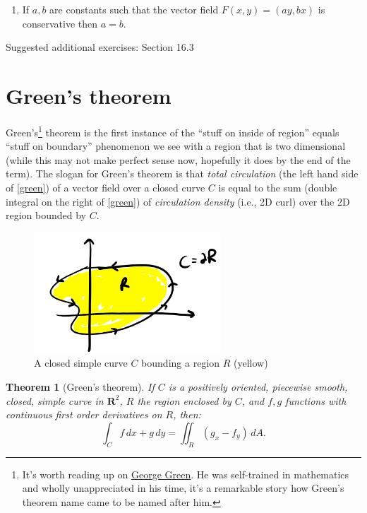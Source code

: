 \documentclass[12pt]{article}
\numberwithin{equation}{subsection}
\numberwithin{figure}{subsection}
\newtheorem{thm}[subsection]{Theorem}
\theoremstyle{note}
\begin{document}
{\begin{enumerate}[label=\arabic*.]
\begin{enumerate}
	\item If $a,b$ are constants such that the vector field $F(x,y)=(ay,bx)$ is conservative then $a=b$. 
\end{enumerate}

\end{enumerate}
Suggested additional exercises: Section 16.3 

\section{Green's theorem}

Green's\footnote{It's worth reading up on \href{https://en.wikipedia.org/wiki/George_Green_(mathematician)}{George Green}. He was self-trained in mathematics and wholly unappreciated in his time, it's a remarkable story how Green's theorem name came to be named after him.}  theorem is the first instance of the ``stuff on inside of region'' equals ``stuff on boundary'' phenomenon we see with a region that is two dimensional (while this may not make perfect sense now, hopefully it does by the end of the term). The slogan for Green's theorem is that \textit{total circulation} (the left hand side of \ref{green}) of a vector field over a closed curve $C$ is equal to the sum (double integral on the right of \ref{green}) of \textit{circulation density} (i.e., 2D curl) over the 2D region bounded by $C$. 
\begin{figure}[h!]
\centering
\includegraphics[width=70mm]{Images/greens-region}
\caption{A closed simple curve $C$ bounding a region $R$ (yellow)}
\label{fig-greens-curve}
\end{figure}
\begin{thm}[Green's theorem]\label{thm-green}If $C$ is a positively oriented, piecewise smooth, closed, simple curve in $\mathbf{R}^2$, $R$ the region enclosed by $C$, and $f,g$ functions with continuous first order derivatives on $R$, then: \begin{equation} \label{green} \int_C f\,dx+g\,dy=\iint_R (g_x-f_y)\,dA.\end{equation}


\end{thm}}
\end{document}
